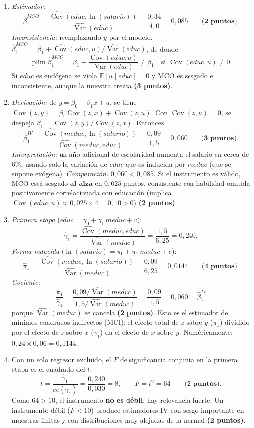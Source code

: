 \documentclass[12pt,letterpaper]{article}
\newcommand{\E}[1]{\mathbb{E}\left[#1\right]}
\DeclareMathOperator{\cov}{Cov}
\DeclareMathOperator{\var}{Var}
\DeclareMathOperator{\plim}{plim}
\begin{document}
\begin{enumerate}
{\begin{enumerate}[label=\alph*)]
    \item \textit{Estimador:}
    \[
        \hat\beta_1^{MCO}=\frac{\widehat{\cov}(educ,\ln(salario))}{\widehat{\var}(educ)}=\frac{0{,}34}{4{,}0}=0{,}085 \qquad\textbf{(2 puntos)}.
    \]
    \textit{Inconsistencia:} reemplazando $y$ por el modelo, $\hat\beta_1^{MCO}=\beta_1+\widehat{\cov}(educ,u)/\widehat{\var}(educ)$, de donde
    \[
        \plim\hat\beta_1^{MCO}=\beta_1+\frac{\cov(educ,u)}{\var(educ)}\neq\beta_1 \quad\text{si }\cov(educ,u)\neq0 .
    \]
    Si $educ$ es endógena se viola $\E{u\mid educ}=0$ y MCO es sesgado e inconsistente, aunque la muestra crezca \textbf{(3 puntos)}.

    \item \textit{Derivación:} de $y=\beta_0+\beta_1x+u$, se tiene $\cov(z,y)=\beta_1\cov(z,x)+\cov(z,u)$. Con $\cov(z,u)=0$, se despeja $\beta_1=\cov(z,y)/\cov(z,x)$. Entonces
    \[
        \hat\beta_1^{IV}=\frac{\widehat{\cov}(meduc,\ln(salario))}{\widehat{\cov}(meduc,educ)}=\frac{0{,}09}{1{,}5}=0{,}060 \qquad\textbf{(3 puntos)}.
    \]
    \textit{Interpretación:} un año adicional de escolaridad aumenta el salario en cerca de $6\%$, usando solo la variación de $educ$ que es inducida por $meduc$ (que se supone exógena). \textit{Comparación:} $0{,}060<0{,}085$. Si el instrumento es válido, MCO está sesgado \textbf{al alza} en $0{,}025$ puntos, consistente con habilidad omitida positivamente correlacionada con educación (implica $\cov(educ,u)\approx0{,}025\times4=0{,}10>0$) \textbf{(2 puntos)}.

    \item \textit{Primera etapa} ($educ=\gamma_0+\gamma_1\,meduc+v$):
    \[
        \hat\gamma_1=\frac{\widehat{\cov}(meduc,educ)}{\widehat{\var}(meduc)}=\frac{1{,}5}{6{,}25}=0{,}240 .
    \]
    \textit{Forma reducida} ($\ln(salario)=\pi_0+\pi_1\,meduc+e$):
    \[
        \hat\pi_1=\frac{\widehat{\cov}(meduc,\ln(salario))}{\widehat{\var}(meduc)}=\frac{0{,}09}{6{,}25}=0{,}0144 \qquad\textbf{(4 puntos)}.
    \]
    \textit{Cociente:}
    \[
        \frac{\hat\pi_1}{\hat\gamma_1}=\frac{0{,}09/\widehat{\var}(meduc)}{1{,}5/\widehat{\var}(meduc)}=\frac{0{,}09}{1{,}5}=0{,}060=\hat\beta_1^{IV}
    \]
    porque $\widehat{\var}(meduc)$ se cancela \textbf{(2 puntos)}. Esto es el estimador de mínimos cuadrados indirectos (MCI): el efecto total de $z$ sobre $y$ ($\pi_1$) dividido por el efecto de $z$ sobre $x$ ($\gamma_1$) da el efecto de $x$ sobre $y$. Numéricamente: $0{,}24\times0{,}06=0{,}0144$.

    \item Con un solo regresor excluido, el $F$ de significancia conjunta en la primera etapa es el cuadrado del $t$:
    \[
        t=\frac{\hat\gamma_1}{ee(\hat\gamma_1)}=\frac{0{,}240}{0{,}030}=8,\qquad F=t^2=64 \qquad\textbf{(2 puntos)}.
    \]
    Como $64>10$, el instrumento \textbf{no es débil}: hay relevancia fuerte. Un instrumento débil ($F<10$) produce estimadores IV con sesgo importante en muestras finitas y con distribuciones muy alejadas de la normal \textbf{(2 puntos)}.
\end{enumerate}}


\end{enumerate}
\end{document}
